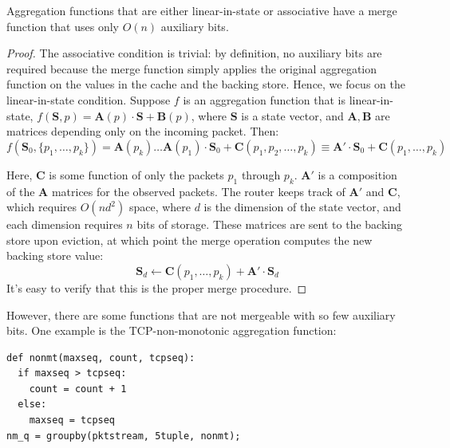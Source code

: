 \begin{theorem}
 Aggregation functions that are either linear-in-state or associative have a
merge function that uses only $O(n)$ auxiliary bits.
\end{theorem}
\begin{proof}
The associative condition is trivial: by definition, no auxiliary bits are required because the merge function simply applies the original aggregation function on the values in the cache and the backing store. Hence, we focus on the linear-in-state condition.
Suppose $f$ is an aggregation function that is linear-in-state, \ie $f(\mathbf{S}, p) = \mathbf{A}(p) \cdot \mathbf{S} + \mathbf{B}(p)$, where $\mathbf{S}$ is a state vector, and $\mathbf{A,B}$ are matrices depending only on the incoming packet. Then:
\[ f(\mathbf{S}_0, \{p_1, \ldots, p_k\}) = \mathbf{A}(p_k)\ldots \mathbf{A}(p_1) \cdot \mathbf{S}_0 + \mathbf{C}(p_1, p_2, \ldots, p_k) \equiv \mathbf{A'} \cdot \mathbf{S}_0 + \mathbf{C}(p_1, \ldots, p_k)\]

Here, $\mathbf{C}$ is some function of only the packets $p_1$ through $p_k$.
$\mathbf{A'}$ is a composition of the $\mathbf{A}$ matrices for the observed
packets. The router keeps track of $\mathbf{A'}$ and $\mathbf{C}$, which
requires $O(nd^2)$ space, where $d$ is the dimension of the state vector, and
each dimension requires $n$ bits of storage. These matrices are sent to the
backing store upon eviction, at which point the merge operation computes the
new backing store value: \[ \mathbf{S}_d \leftarrow \mathbf{C}(p_1, \ldots,
p_k) + \mathbf{A'} \cdot \mathbf{S}_d \] It's easy to verify that this is the
proper merge procedure.
\end{proof}

However, there are some functions that are not mergeable with so few auxiliary
bits.  One example is the TCP-non-monotonic aggregation function:
\begin{verbatim}
def nonmt(maxseq, count, tcpseq):
  if maxseq > tcpseq:
    count = count + 1
  else:
    maxseq = tcpseq
nm_q = groupby(pktstream, 5tuple, nonmt);
\end{verbatim}

